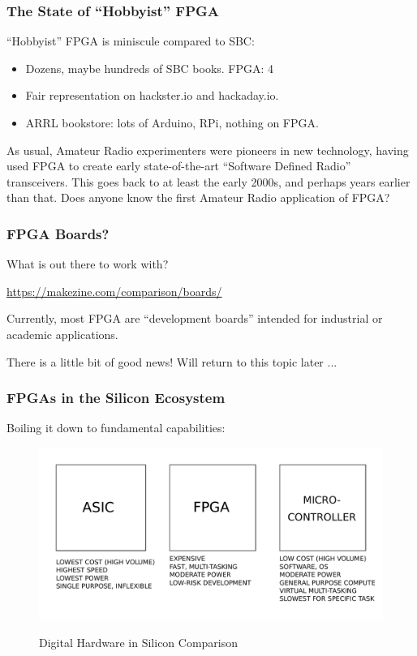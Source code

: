 \documentclass{beamer}
\begin{document}
\begin{frame}
\frametitle{The State of ``Hobbyist'' FPGA}

``Hobbyist'' FPGA is miniscule compared to SBC:

\begin{itemize}
	\item Dozens, maybe hundreds of SBC books.  FPGA: 4
	\item Fair representation on hackster.io and hackaday.io.
	\item ARRL bookstore: lots of Arduino, RPi, nothing on FPGA.
\end{itemize}

As usual, Amateur Radio experimenters were pioneers in new technology, having used FPGA to create early state-of-the-art ``Software Defined Radio'' transceivers.  This goes back to at least the early 2000s, and perhaps years earlier than that.  Does anyone know the first Amateur Radio application of FPGA? 

\end{frame}

\begin{frame}
\frametitle{FPGA Boards?}

What is out there to work with?

\url{https://makezine.com/comparison/boards/}

Currently, most FPGA are ``development boards'' intended for industrial or academic applications.

There is a little bit of good news!  Will return to this topic later ...

\end{frame}

\begin{frame}
\frametitle{FPGAs in the Silicon Ecosystem}

Boiling it down to fundamental capabilities:

\begin{figure}[h]
	\centering
	\includegraphics[width=1.0\textwidth]{graphics/asic_fpga_micro}
	\centering\bfseries
	\caption{Digital Hardware in Silicon Comparison}
\end{figure}


\end{frame}
\end{document}
